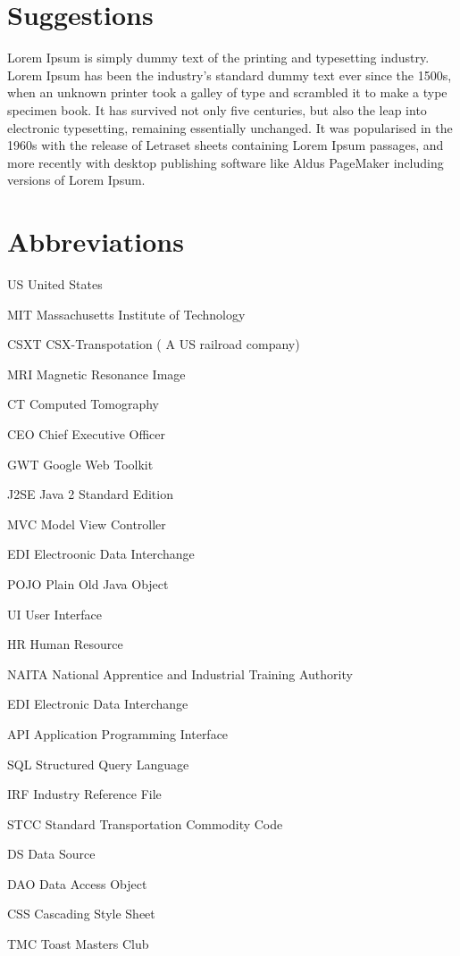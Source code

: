 \documentclass[12pt,a4paper]{report}
\newcommand{\abbrlabel}[1]{\makebox[3cm][l]{\textbf{#1}\ \dotfill}}
\newenvironment{abbreviations}{\begin{list}{}{\renewcommand{\makelabel}{\abbrlabel}}}{\end{list}}
\begin{document}
\section{Suggestions}

Lorem Ipsum is simply dummy text of the printing and typesetting industry. Lorem Ipsum has been the industry's standard dummy text ever since the 1500s, when an unknown printer took a galley of type and scrambled it to make a type specimen book. It has survived not only five centuries, but also the leap into electronic typesetting, remaining essentially unchanged. It was popularised in the 1960s with the release of Letraset sheets containing Lorem Ipsum passages, and more recently with desktop publishing software like Aldus PageMaker including versions of Lorem Ipsum.


\newpage
\section*{Abbreviations}
\begin{abbreviations}
\item[US] United States
\item[MIT] Massachusetts Institute of Technology
\item[CSXT] CSX-Transpotation ( A US railroad company)
\item[MRI] Magnetic Resonance Image
\item[CT] Computed Tomography 
\item[CEO] Chief Executive Officer
\item[GWT] Google Web Toolkit
\item[J2SE] Java 2 Standard Edition
\item[MVC] Model View Controller
\item[EDI] Electroonic Data Interchange
\item[POJO] Plain Old Java Object
\item[UI] User Interface
\item[HR] Human Resource
\item[NAITA] National Apprentice and Industrial Training Authority
\item[EDI] Electronic Data Interchange
\item[API] Application Programming Interface
\item[SQL] Structured Query Language
\item[IRF] Industry Reference File
\item[STCC] Standard Transportation Commodity Code 
\item[DS] Data Source
\item[DAO] Data Access Object
\item[CSS] Cascading Style Sheet
\item[TMC] Toast Masters Club
\end{abbreviations}

\renewcommand{\bibname}{References}


\end{document}
